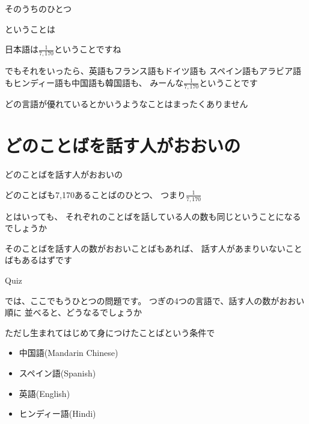 \documentclass[
  ignorenonframetext,
  aspectratio=169,
  xcolor=dvipsnames]{beamer}
\providecommand{\tightlist}{%
  \setlength{\itemsep}{0pt}\setlength{\parskip}{0pt}}
\begin{document}
\begin{frame}{そのうちのひとつ}
\protect{}\label{ux305dux306eux3046ux3061ux306eux3072ux3068ux3064}
\Large

ということは\pause

日本語は\Huge \phantom{0}\(\frac{1}{7,170}\)\phantom{0}\Large ということですね

\vfill
\pause

でもそれをいったら、\pause 英語もフランス語もドイツ語も\pause
スペイン語もアラビア語もヒンディー語も\pause 中国語も韓国語も、\pause
みーんな\Huge\phantom{0}\(\frac{1}{7,170}\)\phantom{0}\Large ということです

\vfill
\pause

どの言語が優れているとかいうようなことはまったくありません
\end{frame}

\begin{frame}{}
\protect{}\label{section-6}
\section{どのことばを話す人がおおいの}
\end{frame}

\begin{frame}{どのことばを話す人がおおいの}
\protect{}\label{ux3069ux306eux3053ux3068ux3070ux3092ux8a71ux3059ux4ebaux304cux304aux304aux3044ux306e}
\Large

どのことばも7,170あることばのひとつ、\pause
つまり\Huge\phantom{0}\(\frac{1}{7,170}\)\phantom{0}

\Large
\pause

とはいっても、
それぞれのことばを話している人の数も同じということになるでしょうか

\pause

そのことばを話す人の数がおおいことばもあれば、
話す人があまりいないことばもあるはずです
\end{frame}

\begin{frame}{Quiz}
\protect{}\label{quiz}
\Large

では、ここでもうひとつの問題です。
つぎの4つの言語で、話す人の数がおおい順に
並べると、どうなるでしょうか\pause

ただし生まれてはじめて身につけたことばという条件で

\pause

\begin{itemize}[<+->]
\tightlist
\item
  中国語(Mandarin Chinese)
\item
  スペイン語(Spanish)
\item
  英語(English)
\item
  ヒンディー語(Hindi)
\end{itemize}
\end{frame}
\end{document}
